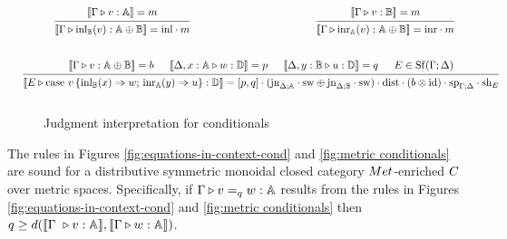 \documentclass[a4paper,UKenglish,cleveref, autoref, thm-restate]{lipics-v2021}
\begin{document}
\begin{figure}[H]
\small
  \begin{equation*}
  \begin{aligned}
  &\hspace{10pt}
  \begin{prooftree}
      \hypo{ [\![\Gamma \vljud v: \typeA]\!] = m }
      \infer1[]{ [\![ \Gamma \vljud \text{inl}_{\typeB} (v):  \typeA \oplus \typeB  ]\!] = \inl  \comp m}
  \end{prooftree}
  \hspace{120pt}
  \begin{prooftree}
    \hypo{ [\![\Gamma \vljud v: \typeB]\!] = m }
    \infer1[]{ [\![ \Gamma \vljud \text{inr}_{\typeA} (v):  \typeA \oplus \typeB  ]\!] = \inr  \comp m}
\end{prooftree}
  \\[20pt]
  &\hspace{-20pt}
  \begin{prooftree}
      \hypo{[\![\Gamma\vljud v: \typeA \oplus \typeB ]\!] = b}
      \hypo{[\![\Delta, x:\typeA \vljud w: \typeD ]\!] = p}
      \hypo{ [\![\Delta,y:\typeB \vljud u: \typeD ]\!] = q }
      \hypo{E \in \Shuff(\Gamma; \Delta)}
      \infer4[]{ [\![E \vljud \text{case } v\,  \{\text{inl}_{\typeB} (x) \Rightarrow w ;\, \text{inr}_{\typeA} (y) \Rightarrow u\}: \typeD ]\!] =   [p,q] \comp (\text{jn}_{\Delta;\typeA}\comp \sw \oplus \text{jn}_{\Delta;\typeB}\comp \sw) \comp \dist \comp (b \otimes \text{id}) \comp \text{sp}_{\Gamma;\Delta} \comp \text{sh}_{E}}
  \end{prooftree}
  \\[10pt]
  \end{aligned}
  \end{equation*}
  \caption{Judgment interpretation for conditionals}
\label{fig:denotational_sem cond}
\end{figure}


\begin{theorem}
  The rules in Figures \ref{fig:equations-in-context-cond} and \ref{fig:metric conditionals} are sound for a  distributive symmetric monoidal closed category $\catMet$-enriched $\catC$ over metric spaces. Specifically, if $\Gamma \triangleright v =_{q} w : \mathbb{A} $ results from the rules in Figures \ref{fig:equations-in-context-cond} and \ref{fig:metric conditionals} then $q \geq d( \llbracket \Gamma  \vljud v : \typeA \rrbracket, \llbracket\Gamma \vljud w : \typeA \rrbracket)$.
\end{theorem}
\end{document}
